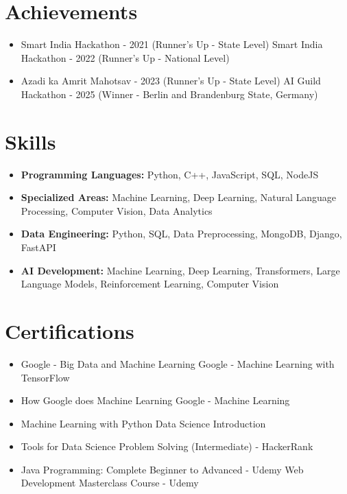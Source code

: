 \documentclass[a4paper,10pt]{article}
\begin{document}
\section*{Achievements}
\begin{itemize}
\item Smart India Hackathon - 2021 (Runner's Up - State Level) \hfill Smart India Hackathon - 2022 (Runner's Up - National Level)
\item Azadi ka Amrit Mahotsav - 2023 (Runner's Up - State Level) \hfill AI Guild Hackathon - 2025 (Winner - Berlin and Brandenburg State, Germany)
\end{itemize}

\section*{Skills}
\begin{itemize}
  \item \textbf{Programming Languages:} Python, C++, JavaScript, SQL, NodeJS
  \item \textbf{Specialized Areas:} Machine Learning, Deep Learning, Natural Language Processing, Computer Vision, Data Analytics
  \item \textbf{Data Engineering:} Python, SQL, Data Preprocessing, MongoDB, Django, FastAPI
  \item \textbf{AI Development:} Machine Learning, Deep Learning, Transformers, Large Language Models, Reinforcement Learning, Computer Vision
\end{itemize}

\section*{Certifications}
\begin{itemize}
\item Google - Big Data and Machine Learning \hfill Google - Machine Learning with TensorFlow
\item How Google does Machine Learning \hfill Google - Machine Learning
\item Machine Learning with Python \hfill Data Science Introduction
\item Tools for Data Science \hfill Problem Solving (Intermediate) - HackerRank
\item Java Programming: Complete Beginner to Advanced - Udemy \hfill Web Development Masterclass Course - Udemy
\end{itemize}
\end{document}
